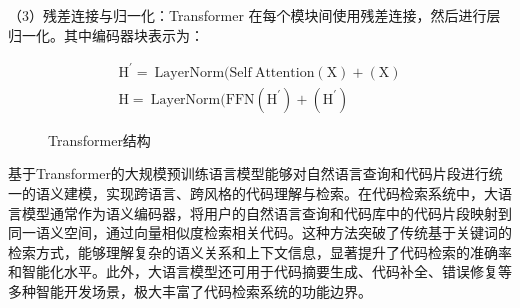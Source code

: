 \documentclass[UTF8,a4paper,12pt]{ctexart}
\numberwithin{equation}{section}
\begin{document}
（3）残差连接与归一化：Transformer 在每个模块间使用残差连接，然后进行层归一化。其中编码器块表示为：\par
\begin{eqnarray}
	\mathrm{H^{\prime}=~LayerNorm(Self~Attention(X)+(X)} \\
	\mathrm{H=~LayerNorm(FFN(H^{\prime})+(H^{\prime})}
	\label{func_4}
\end{eqnarray}
\begin{figure}[H] 
	\caption{Transformer结构}
	\label{transformer}
\end{figure} %
基于Transformer的大规模预训练语言模型能够对自然语言查询和代码片段进行统一的语义建模，实现跨语言、跨风格的代码理解与检索。在代码检索系统中，大语言模型通常作为语义编码器，将用户的自然语言查询和代码库中的代码片段映射到同一语义空间，通过向量相似度检索相关代码。这种方法突破了传统基于关键词的检索方式，能够理解复杂的语义关系和上下文信息，显著提升了代码检索的准确率和智能化水平。此外，大语言模型还可用于代码摘要生成、代码补全、错误修复等多种智能开发场景，极大丰富了代码检索系统的功能边界。
\end{document}
